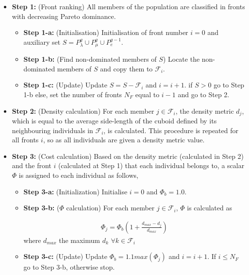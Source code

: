 \begin{itemize}
\item[]{\bf Step 1:}  (Front ranking) All members of the population are classified in fronts with decreasing Pareto dominance.  
\begin{itemize}
\item[]{\bf Step 1-a:}  (Initialisation) Initialisation of front number $i=0$ and auxiliary set $S=P_{\lambda}^g \cup P_{\mu}^g \cup P_{e}^{g-1}$.

\item[]{\bf Step 1-b:}  (Find non-dominated members of $S$) Locate the non-dominated members of $S$ and copy them to $\mathcal{F}_i$. 

\item[]{\bf Step 1-c:}  (Update) Update $S=S-\mathcal{F}_i$ and $i=i+1$. if $S>0$ go to Step 1-b else, set the number of fronts $N_F$ equal to $i-1$ and go to Step 2.
\end{itemize}
\item[]{\bf Step 2:}  (Density calculation) For each member $j \in \mathcal{F}_i$, the density metric $d_j$, which is equal to the average side-length of the cuboid defined by its neighbouring individuals in $\mathcal{F}_i$, is calculated. This procedure is repeated for all fronts $i$, so as all individuals are given a density metric value.

\item[]{\bf Step 3:}  (Cost calculation) Based on the density metric (calculated in Step 2) and the front $i$ (calculated at Step 1) that each individual belongs to, a scalar $\Phi$ is assigned to each individual as follows,
\begin{itemize}
\item[]{\bf Step 3-a:}  (Initialization) Initialise $i=0$ and $\Phi_b=1.0$.
\item[]{\bf Step 3-b:}  ($\Phi$ calculation) For each member $j \in \mathcal{F}_i$, $\Phi$ is calculated as

\begin{eqnarray}
	\nonumber
	\Phi_j= \Phi_b(1+\frac{d_{max}-d_j}{d_{max}}) 
\end{eqnarray} 
where $d_{max}$ the maximum $d_k$ $\forall k \in \mathcal{F}_i$   
\item[]{\bf Step 3-c:}  (Update) Update $\Phi_b=1.1max(\Phi_j)$ and $i=i+1$. If $i \leq N_F$ go to Step 3-b, otherwise stop. 
\end{itemize}
\end{itemize}

